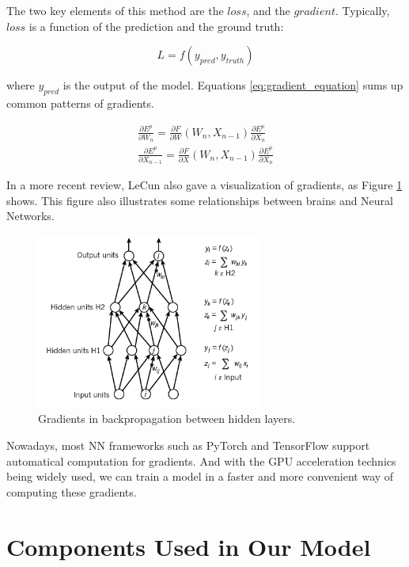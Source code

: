 The two key elements of this method are the $loss$, and the $gradient$. Typically, $loss$ is a function of the prediction and the ground truth:

\begin{equation}
    L=f(y_{pred}, y_{truth})
\end{equation}

where $y_{pred}$ is the output of the model. Equations \ref{eq:gradient_equation} sums up common patterns of gradients.

\begin{eqnarray} \label{eq:gradient_equation}
    \frac{\partial E^p}{\partial W_n}=\frac{\partial F}{\partial W}(W_n,X_{n-1})\frac{\partial E^p}{\partial X_n} \nonumber \\
    \frac{\partial E^p}{\partial X_{n-1}}=\frac{\partial F}{\partial X}(W_n,X_{n-1})\frac{\partial E^p}{\partial X_n}
\end{eqnarray}

In a more recent review, LeCun \cite{hinton2015deep} also gave a visualization of gradients, as Figure \ref{fig:gradient_figure} shows. This figure also illustrates some relationships between brains and Neural Networks.

\begin{figure}[!htbp]
    \centering
    \includegraphics[width=2.9in]{fig/Survey/gradient_figure.png}
    \caption{Gradients in backpropagation between hidden layers.}
    \label{fig:gradient_figure}
\end{figure}

Nowadays, most NN frameworks such as PyTorch and TensorFlow support automatical computation for gradients. And with the GPU acceleration technics being widely used, we can train a model in a faster and more convenient way of computing these gradients.

\section{Components Used in Our Model}

